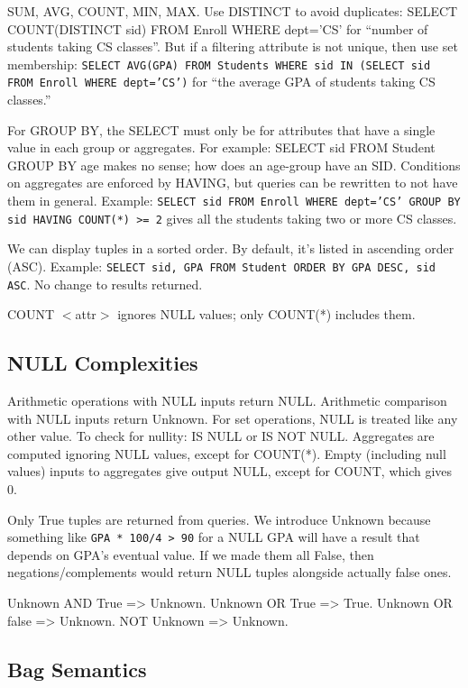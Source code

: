 \documentclass[10pt,letterpaper,twocolumn]{article}
\begin{document}
SUM, AVG, COUNT, MIN, MAX. Use DISTINCT to avoid duplicates: 
SELECT COUNT(DISTINCT sid) FROM Enroll WHERE dept='CS' for
``number of students taking CS classes''.
But if a filtering attribute is not unique, then use set membership: 
\texttt{SELECT AVG(GPA) FROM Students WHERE sid IN (SELECT sid FROM Enroll
WHERE dept='CS')} for ``the average GPA of students taking CS classes.''

For GROUP BY, the SELECT must only be for attributes that 
have a single value in each group or aggregates. For example: 
SELECT sid FROM Student GROUP BY age makes no sense; how does an
age-group have an SID. Conditions on aggregates are enforced by HAVING, 
but queries can be rewritten to not have them in general.
Example: \texttt{SELECT sid FROM Enroll WHERE dept='CS' GROUP BY sid 
HAVING COUNT(*) >= 2} gives all the students taking two or more
CS classes.

We can display tuples in a sorted order. By default,
it's listed in ascending order (ASC).  
Example: \texttt{SELECT sid, GPA FROM Student ORDER BY
GPA DESC, sid ASC}. No change to results returned.

COUNT $<$attr$>$ ignores NULL values; only COUNT(*) includes them.



\subsection{NULL Complexities}

Arithmetic operations with NULL inputs return NULL. 
Arithmetic comparison with NULL inputs return Unknown.
For set operations, NULL is treated like any other 
value. To check for nullity: IS NULL or IS NOT NULL.
Aggregates are computed ignoring NULL values, except
for COUNT(*). Empty (including null values) inputs 
to aggregates give output NULL, except for COUNT, 
which gives 0.

Only True tuples are returned from queries. 
We introduce Unknown because something like 
\texttt{GPA * 100/4 > 90} for a NULL GPA will have
a result that depends on GPA's eventual value. 
If we made them all False, then negations/complements
would return NULL tuples alongside actually false 
ones.

Unknown AND True => Unknown. Unknown OR True => True.
Unknown OR false => Unknown. NOT Unknown => Unknown.


\subsection{Bag Semantics}
\end{document}
